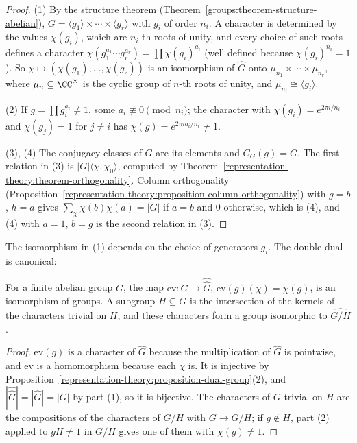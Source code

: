 \begin{proof}
(1) By the structure theorem (Theorem~\ref{groups:theorem-structure-abelian}), $G = \langle g_1\rangle \times \cdots \times \langle g_r\rangle$ with $g_i$ of order $n_i$. A character is determined by the
values $\chi(g_i)$, which are $n_i$-th roots of unity, and every choice of such roots defines a character $\chi(g_1^{a_1}\cdots g_r^{a_r}) = \prod\chi(g_i)^{a_i}$ (well defined because
$\chi(g_i)^{n_i} = 1$). So $\chi \mapsto (\chi(g_1), \ldots, \chi(g_r))$ is an isomorphism of $\widehat G$ onto $\mu_{n_1} \times \cdots \times \mu_{n_r}$, where $\mu_n \subseteq \CC^\times$ is the cyclic group
of $n$-th roots of unity, and $\mu_{n_i} \cong \langle g_i\rangle$.

(2) If $g = \prod g_i^{a_i} \neq 1$, some $a_i \not\equiv 0 \pmod{n_i}$; the character with $\chi(g_i) = e^{2\pi i/n_i}$ and $\chi(g_j) = 1$ for $j \neq i$ has $\chi(g) = e^{2\pi ia_i/n_i} \neq 1$.

(3), (4) The conjugacy classes of $G$ are its elements and $C_G(g) = G$. The first relation in (3) is $|G|\langle\chi, \chi_0\rangle$, computed by Theorem~\ref{representation-theory:theorem-orthogonality}.
Column orthogonality (Proposition~\ref{representation-theory:proposition-column-orthogonality}) with $g = b$, $h = a$ gives $\sum_\chi\chi(b)\overline{\chi(a)} = |G|$ if $a = b$ and $0$ otherwise, which is
(4), and (4) with $a = 1$, $b = g$ is the second relation in (3).
\end{proof}

The isomorphism in (1) depends on the choice of generators $g_i$. The double dual is canonical:

\begin{proposition}\label{representation-theory:proposition-double-dual}
For a finite abelian group $G$, the map $\mathrm{ev} \colon G \to \widehat{\widehat G}$, $\mathrm{ev}(g)(\chi) = \chi(g)$, is an isomorphism of groups. A subgroup $H \subseteq G$ is the intersection of
the kernels of the characters trivial on $H$, and these characters form a group isomorphic to $\widehat{G/H}$.
\end{proposition}

\begin{proof}
$\mathrm{ev}(g)$ is a character of $\widehat G$ because the multiplication of $\widehat G$ is pointwise, and $\mathrm{ev}$ is a homomorphism because each $\chi$ is. It is injective by
Proposition~\ref{representation-theory:proposition-dual-group}(2), and $|\widehat{\widehat G}| = |\widehat G| = |G|$ by part (1), so it is bijective. The characters of $G$ trivial on $H$ are the
compositions of the characters of $G/H$ with $G \to G/H$; if $g \notin H$, part (2) applied to $gH \neq 1$ in $G/H$ gives one of them with $\chi(g) \neq 1$.
\end{proof}

